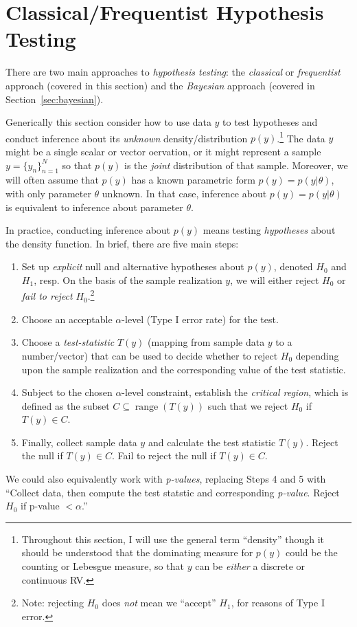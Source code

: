 \documentclass[12pt]{article}
\theoremstyle{plain}
\theoremstyle{definition}
\theoremstyle{remark}
\newcommand{\range}{\operatorname{range}}
\newcommand{\nN}{_{n=1}^N}
\begin{document}
\clearpage
\section{Classical/Frequentist Hypothesis Testing}

There are two main approaches to \emph{hypothesis testing}: the
\emph{classical} or \emph{frequentist} approach (covered in this
section) and the \emph{Bayesian} approach (covered in
Section~\ref{sec:bayesian}).

Generically this section consider how to use data $y$ to test
hypotheses and conduct inference about its \emph{unknown}
density/distribution $p(y)$.\footnote{%
  Throughout this section, I will use the general term ``density''
  though it should be understood that the dominating measure for $p(y)$
  could be the counting or Lebesgue measure, so that $y$ can be
  \emph{either} a discrete or continuous RV.
}
The data $y$ might be a single scalar or vector oervation, or it
might represent a sample $y=\{y_n\}\nN$ so that $p(y)$ is the
\emph{joint} distribution of that sample.
Moreover, we will often assume that $p(y)$ has a known parametric
form $p(y)=p(y|\theta)$, with only parameter $\theta$ unknown.
In that case, inference about $p(y)=p(y|\theta)$ is equivalent
to inference about parameter $\theta$.

In practice, conducting inference about $p(y)$ means testing
\emph{hypotheses} about the density function.
In brief, there are five main steps:
\begin{enumerate}
  \item
    Set up \emph{explicit} null and alternative hypotheses about
    $p(y)$, denoted $H_0$ and $H_1$, resp.
    On the basis of the sample realization $y$, we will either reject
    $H_0$ or \emph{fail to reject} $H_0$.\footnote{%
      Note: rejecting $H_0$ does \emph{not} mean we ``accept'' $H_1$,
      for reasons of Type I error.
    }

  \item Choose an acceptable $\alpha$-level (Type I error rate) for the
    test.

  \item Choose a \emph{test-statistic} $T(y)$ (mapping from sample
    data $y$ to a number/vector) that can be used to decide whether
    to reject $H_0$ depending upon the sample realization and
    the corresponding value of the test statistic.


  \item
    Subject to the chosen $\alpha$-level constraint, establish the
    \emph{critical region}, which is defined as the subset
    $C\subseteq \range(T(y))$ such that we reject $H_0$ if
    $T(y)\in C$.

  \item
    Finally, collect sample data $y$ and calculate the test statistic
    $T(y)$. Reject the null if $T(y)\in C$. Fail to reject the
    null if $T(y)\in C$.

\end{enumerate}
We could also equivalently work with \emph{p-values}, replacing Steps 4
and 5 with
``Collect data, then compute the test statstic and corresponding
\emph{p-value}.  Reject $H_0$ if p-value $<\alpha$.''
\end{document}
